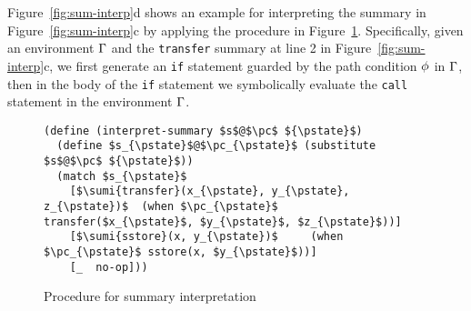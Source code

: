 
\begin{example}
Figure~\ref{fig:sum-interp}d shows an example for interpreting the summary in
Figure~\ref{fig:sum-interp}c by applying the procedure in
Figure~\ref{fig:sum-inter}. Specifically, given an environment $\Gamma$ and the
\texttt{transfer} summary at line 2 in Figure~\ref{fig:sum-interp}c, we first
generate an \texttt{if} statement guarded by the path condition $\phi$ in $\Gamma$, 
then in the body of the \texttt{if} statement we symbolically
evaluate the \texttt{call} statement in the environment $\Gamma$.
\end{example}



\begin{figure}[!t]
  \centering
  \begin{minipage}{0.5\linewidth}
\begin{lstlisting}[linewidth=8cm] 
(define (interpret-summary $s$@$\pc$ ${\pstate}$) 
  (define $s_{\pstate}$@$\pc_{\pstate}$ (substitute $s$@$\pc$ ${\pstate}$))
  (match $s_{\pstate}$
    [$\sumi{transfer}(x_{\pstate}, y_{\pstate}, z_{\pstate})$  (when $\pc_{\pstate}$ transfer($x_{\pstate}$, $y_{\pstate}$, $z_{\pstate}$))]
    [$\sumi{sstore}(x, y_{\pstate})$     (when $\pc_{\pstate}$ sstore(x, $y_{\pstate}$))]
    [_  no-op]))
\end{lstlisting}
\end{minipage}
\vspace{-0.1in}
		\caption{Procedure for summary interpretation}
		\vspace{-0.1in}
      \label{fig:sum-inter}
\end{figure}